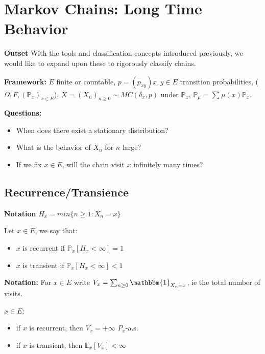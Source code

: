\chapter{Markov Chains: Long Time Behavior}
\noindent \textbf{Outset} With the tools and classification concepts introduced previously, we would like to expand upon these to rigorously classify chains.

\noindent \textbf{Framework:} $E$ finite or countable, $p=(p_{xy})x,y \in E$ transition probabilities, ($\Omega, F, (\mathbb{P}_x) _{x \in E}$), $X=(X_n)_{n\geq 0} \sim MC(\delta_x,p)$ under $\mathbb{P}_x$, $\mathbb{P}_\mu = \sum_{}^{} \mu (x)\mathbb{P}_x$.

\noindent \textbf{Questions:} 
\begin{itemize}
	\item When does there exist a stationary distribution?
	\item What is the behavior of $X_n$ for $n$ large?
	\item If we fix $x \in E$, will the chain visit $x$ infinitely many times?
\end{itemize}

\section{Recurrence/Transience}

\textbf{Notation} $H_x = min\{n\geq 1: X_n=x\}$
\begin{defn}
	Let $x \in E$, we say that:
\begin{itemize}
	\item $x$ is recurrent if $\mathbb{P}_{x} \left[ H_x<\infty \right]=1 $
	\item $x$ is transient if $\mathbb{P}_{x} \left[ H_x<\infty \right] <1$ 
\end{itemize}

\end{defn}
\noindent
\textbf{Notation:} For $x \in E$ write $V_x=\sum_{n\geq 0}^{} \mathbbm{1}_{X_n=x} $, ie the total number of visits.

\begin{theorem}
	$x \in E$:
\begin{itemize}
	\item if $x$ is recurrent, then $V_{x}=+\infty$ $P_x$-a.s.
	\item if $x$ is transient, then $\mathbb{E}_{x} \left[ V_x \right] <\infty$
\end{itemize}
\end{theorem}

